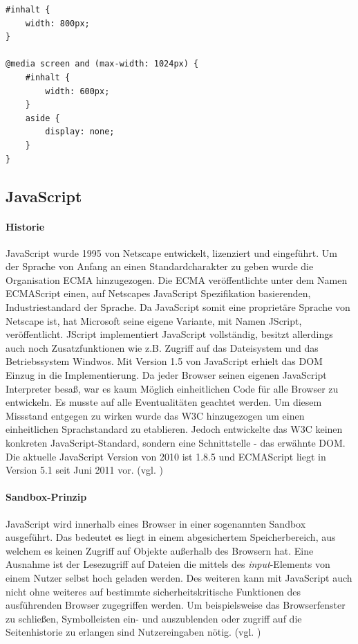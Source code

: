\documentclass[12pt,a4paper,bibliography=totocnumbered,listof=totocnumbered]{scrartcl}
\begin{document}
	\vspace{1em}
	\begin{lstlisting}[caption=CSS3 eigenschaftsspezifisches Stylesheet, label=lst:css3mediaquery]
#inhalt {
	width: 800px;
}
 
@media screen and (max-width: 1024px) {
	#inhalt {
		width: 600px;
	}
	aside {
		display: none;
	}
}
	\end{lstlisting}

\subsection{JavaScript}
\paragraph{Historie} JavaScript wurde 1995 von Netscape entwickelt, lizenziert und eingeführt. Um der Sprache von Anfang an einen Standardcharakter zu geben wurde die Organisation \ac{ECMA} hinzugezogen. Die ECMA veröffentlichte unter dem Namen ECMAScript einen, auf Netscapes JavaScript Spezifikation basierenden, Industriestandard der Sprache. Da JavaScript somit eine proprietäre Sprache von Netscape ist, hat Microsoft seine eigene Variante, mit Namen JScript, veröffentlicht. JScript implementiert JavaScript vollständig, besitzt allerdings auch noch Zusatzfunktionen wie z.B. Zugriff auf das Dateisystem und das Betriebssystem Windwos. Mit Version 1.5 von JavaScript erhielt das DOM Einzug in die Implementierung. Da jeder Browser seinen eigenen JavaScript Interpreter besaß, war es kaum Möglich einheitlichen Code für alle Browser zu entwickeln. Es musste auf alle Eventualitäten geachtet werden. Um diesem Missstand entgegen zu wirken wurde das W3C hinzugezogen um einen einheitlichen Sprachstandard zu etablieren. Jedoch entwickelte das W3C keinen konkreten JavaScript-Standard, sondern eine Schnittstelle - das erwähnte DOM. Die aktuelle JavaScript Version von 2010 ist 1.8.5 und ECMAScript liegt in Version 5.1 seit Juni 2011 vor. (vgl. \cite{SelfHtml20146})

\paragraph{Sandbox-Prinzip} JavaScript wird innerhalb eines Browser in einer sogenannten Sandbox ausgeführt. Das bedeutet es liegt in einem abgesichertem Speicherbereich, aus welchem es keinen Zugriff auf Objekte außerhalb des Browsern hat. Eine Ausnahme ist der Lesezugriff auf Dateien die mittels des \textit{input}-Elements von einem Nutzer selbst hoch geladen werden. Des weiteren kann mit JavaScript auch nicht ohne weiteres auf bestimmte sicherheitskritische Funktionen des ausführenden Browser zugegriffen werden. Um beispielsweise das Browserfenster zu schließen, Symbolleisten ein- und auszublenden oder zugriff auf die Seitenhistorie zu erlangen sind Nutzereingaben nötig. (vgl. \cite{WikiJS2014})
\end{document}
